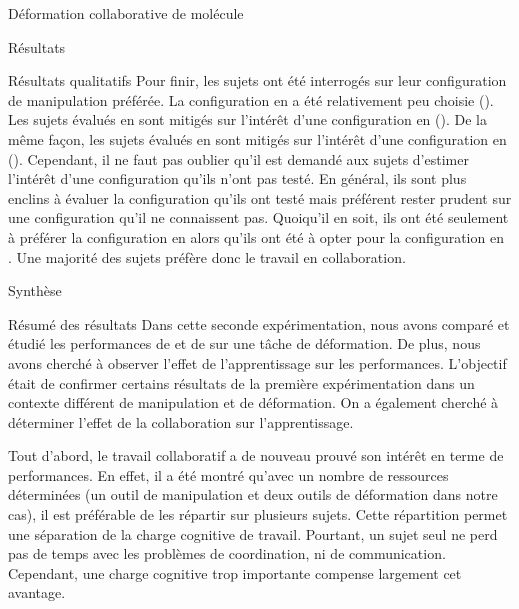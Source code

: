 \documentclass[myfrancais]{mythesis}
\begin{document}
\begin{mychapter}{Déformation collaborative de molécule}
\begin{mysection}{Résultats}
\begin{mysubsection}{Résultats qualitatifs}
				Pour finir, les sujets ont été interrogés sur leur configuration de manipulation préférée.
				La configuration  en  a été relativement peu choisie ().
				Les sujets évalués en  sont mitigés sur l'intérêt d'une configuration  en  ().
				De la même façon, les sujets évalués en  sont mitigés sur l'intérêt d'une configuration  en  ().
				Cependant, il ne faut pas oublier qu'il est demandé aux sujets d'estimer l'intérêt d'une configuration qu'ils n'ont pas testé.
				En général, ils sont plus enclins à évaluer la configuration qu'ils ont testé mais préférent rester prudent sur une configuration qu'il ne connaissent pas.
				Quoiqu'il en soit, ils ont été seulement  à préférer la configuration  en  alors qu'ils ont été  à opter pour la configuration  en .
				Une majorité des sujets préfère donc le travail en collaboration.
			\end{mysubsection}
		\end{mysection}
		\begin{mysection}{Synthèse}
			\begin{mysubsection}{Résumé des résultats}
				Dans cette seconde expérimentation, nous avons comparé et étudié les performances de  et de  sur une tâche de déformation.
				De plus, nous avons cherché à observer l'effet de l'apprentissage sur les performances.
				L'objectif était de confirmer certains résultats de la première expérimentation dans un contexte différent de manipulation et de déformation.
				On a également cherché à déterminer l'effet de la collaboration sur l'apprentissage.

				Tout d'abord, le travail collaboratif a de nouveau prouvé son intérêt en terme de performances.
				En effet, il a été montré qu'avec un nombre de ressources déterminées (un outil de manipulation et deux outils de déformation dans notre cas), il est préférable de les répartir sur plusieurs sujets.
				Cette répartition permet une séparation de la charge cognitive de travail.
				Pourtant, un sujet seul ne perd pas de temps avec les problèmes de coordination, ni de communication.
				Cependant, une charge cognitive trop importante compense largement cet avantage.


\end{mysubsection}
\end{mysection}
\end{mychapter}
\end{document}
